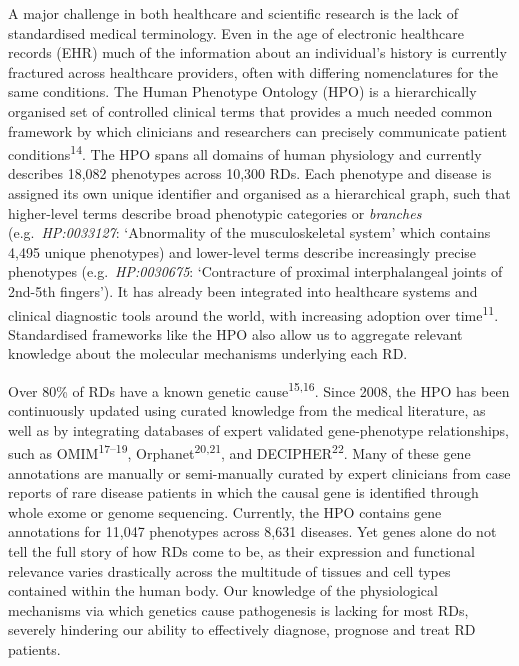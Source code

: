 \documentclass[
]{report}
\begin{document}
A major challenge in both healthcare and scientific research is the lack
of standardised medical terminology. Even in the age of electronic
healthcare records (EHR) much of the information about an individual's
history is currently fractured across healthcare providers, often with
differing nomenclatures for the same conditions. The Human Phenotype
Ontology (HPO) is a hierarchically organised set of controlled clinical
terms that provides a much needed common framework by which clinicians
and researchers can precisely communicate patient
conditions\textsuperscript{14}. The HPO spans all domains of human
physiology and currently describes 18,082 phenotypes across 10,300 RDs.
Each phenotype and disease is assigned its own unique identifier and
organised as a hierarchical graph, such that higher-level terms describe
broad phenotypic categories or \emph{branches} (e.g.~\emph{HP:0033127}:
`Abnormality of the musculoskeletal system' which contains 4,495 unique
phenotypes) and lower-level terms describe increasingly precise
phenotypes (e.g.~\emph{HP:0030675}: `Contracture of proximal
interphalangeal joints of 2nd-5th fingers'). It has already been
integrated into healthcare systems and clinical diagnostic tools around
the world, with increasing adoption over time\textsuperscript{11}.
Standardised frameworks like the HPO also allow us to aggregate relevant
knowledge about the molecular mechanisms underlying each RD.

Over 80\% of RDs have a known genetic cause\textsuperscript{15,16}.
Since 2008, the HPO has been continuously updated using curated
knowledge from the medical literature, as well as by integrating
databases of expert validated gene-phenotype relationships, such as
OMIM\textsuperscript{17--19}, Orphanet\textsuperscript{20,21}, and
DECIPHER\textsuperscript{22}. Many of these gene annotations are
manually or semi-manually curated by expert clinicians from case reports
of rare disease patients in which the causal gene is identified through
whole exome or genome sequencing. Currently, the HPO contains gene
annotations for 11,047 phenotypes across 8,631 diseases. Yet genes alone
do not tell the full story of how RDs come to be, as their expression
and functional relevance varies drastically across the multitude of
tissues and cell types contained within the human body. Our knowledge of
the physiological mechanisms via which genetics cause pathogenesis is
lacking for most RDs, severely hindering our ability to effectively
diagnose, prognose and treat RD patients.
\end{document}
